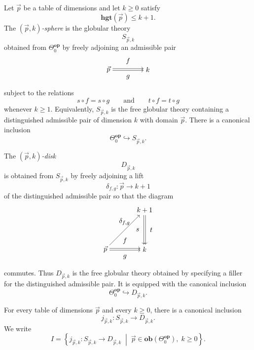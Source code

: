 \documentclass{tac}
\begin{document}
\begin{definition}\label{spheres_in_inf_gpds}
Let $\vec{p}$ be a table of dimensions and let $k\geq0$ satisfy
\[
\mathbf{hgt}(\vec{p})\leq k+1.
\]
The \emph{$(\vec{p},k)$-sphere} is the globular theory
\[
S_{\vec{p},k}
\]
obtained from $\Theta_0^\mathbf{op}$ by freely adjoining an admissible pair
\[
\begin{tikzpicture}[node distance=2cm]
    \node (A) {$\vec{p}$};
    \node (B)[right of=A]{$k$};
    \draw[transform canvas={yshift=0.3ex},->]
        (A) to node[above=3] {$f$} (B);
    \draw[transform canvas={yshift=-0.3ex},->,swap]
        (A) to node[below=3] {$g$} (B);
\end{tikzpicture}
\]
subject to the relations
\[
s\circ f=s\circ g
\qquad\text{and}\qquad
t\circ f=t\circ g
\]
whenever $k\geq1$. Equivalently, $S_{\vec{p},k}$ is the free globular theory containing a distinguished admissible pair of dimension $k$ with domain $\vec{p}$. There is a canonical inclusion
\[
\Theta_0^\mathbf{op}\hookrightarrow S_{\vec{p},k}.
\]
\end{definition}

\begin{definition}\label{disks_in_inf_gpds}
The \emph{$(\vec{p},k)$-disk}
\[
D_{\vec{p},k}
\]
is obtained from $S_{\vec{p},k}$ by freely adjoining a lift
\[
\delta_{f,g}:\vec{p}\longrightarrow k+1
\]
of the distinguished admissible pair so that the diagram
\[
\begin{tikzpicture}[node distance=2cm]
    \node (A) {$\vec{p}$};
    \node (B)[right of=A]{$k$};
    \node (C) [above of=B]{$k+1$};
    \draw[transform canvas={yshift=0.3ex},->]
        (A) to node[above=3] {$f$} (B);
    \draw[transform canvas={yshift=-0.3ex},->,swap]
        (A) to node[below=3] {$g$} (B);
    \draw[transform canvas={xshift=-0.3ex},->]
        (C) to node[left=3] {$s$} (B);
    \draw[transform canvas={xshift=0.3ex},->,swap]
        (C) to node[right=3] {$t$} (B);
    \draw[->]
        (A) to node[above=4] {$\delta_{f,g}$} (C);
\end{tikzpicture}
\]
commutes. Thus $D_{\vec{p},k}$ is the free globular theory obtained by specifying a filler for the distinguished admissible pair. It is equipped with the canonical inclusion
\[
\Theta_0^\mathbf{op}\hookrightarrow D_{\vec{p},k}.
\]
\end{definition}

\begin{notation}\label{incl_of_sphere_into_disks}
For every table of dimensions $\vec{p}$ and every $k\geq0$, there is a canonical inclusion
\[
j_{\vec{p},k}:S_{\vec{p},k}\longrightarrow D_{\vec{p},k}.
\]
We write
\[
I=
\left\{
j_{\vec{p},k}
:
S_{\vec{p},k}\rightarrow D_{\vec{p},k}
\;\middle|\;
\vec{p}\in\mathbf{ob}(\Theta_0^\mathbf{op}),\;
k\ge0
\right\}.
\]
\end{notation}
\end{document}
